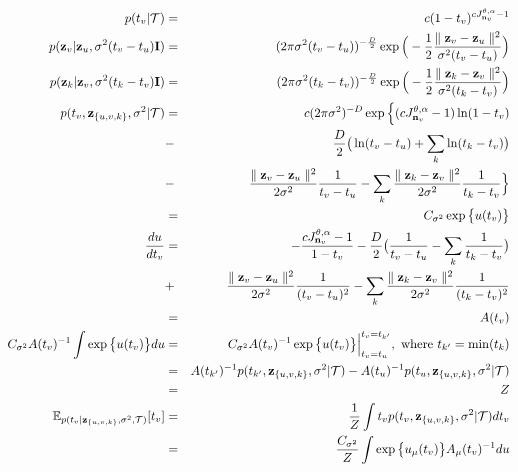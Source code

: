 \documentclass{article}
\begin{document}
	\begin{eqnarray}
	p(t_v | \mathcal{T}) &=& c(1-t_v)^{cJ^{\theta,\alpha}_{\bold{n}_v} - 1} \\
	p(\bold{z}_v | \bold{z}_u, \sigma^2(t_v - t_u)\bold{I}) &=& (2 \pi \sigma^2(t_v - t_u))^{-\frac{D}{2}} \exp \Big(-\frac{1}{2}\frac{\parallel \bold{z}_v - \bold{z}_u \parallel^2}{\sigma^2 (t_v - t_u)} \Big)\\
	p(\bold{z}_k | \bold{z}_v, \sigma^2(t_k - t_v)\bold{I}) &=& (2 \pi \sigma^2(t_k - t_v))^{-\frac{D}{2}} \exp \Big(-\frac{1}{2}\frac{\parallel \bold{z}_k - \bold{z}_v \parallel^2}{\sigma^2 (t_k - t_v)} \Big)\\
	p(t_v, \bold{z}_{\{u,v,k\}}, \sigma^2 | \mathcal{T}) & = & c(2 \pi \sigma^2)^{-D}\exp \Big\{(cJ^{\theta,\alpha}_{\bold{n}_v} - 1)\ln(1 - t_v) \nonumber \\
	 &-& \frac{D}{2} \big( \ln(t_v - t_u) + \sum_k \ln(t_k - t_v) \big) \nonumber \\
	 &-& \frac{\parallel \bold{z}_v - \bold{z}_u\parallel^2}{2\sigma^2}\frac{1}{t_v - t_u} - \sum_k \frac{\parallel \bold{z}_k - \bold{z}_v\parallel^2}{2\sigma^2}\frac{1}{t_k - t_v} \Big\}  \nonumber\\
	 &=& C_{\sigma^2} \exp \big\{ u(t_v) \big\}\\
	\frac{du}{dt_v} &=& -\frac{cJ^{\theta,\alpha}_{\bold{n}_v} - 1}{1 - t_v} - \frac{D}{2}\big( \frac{1}{t_v - t_u} - \sum_k\frac{1}{t_k - t_v}\big) \nonumber \\
	 &+& \frac{\parallel \bold{z}_v - \bold{z}_u\parallel^2}{2\sigma^2}\frac{1}{(t_v - t_u)^2} - \sum_k \frac{\parallel \bold{z}_k - \bold{z}_v\parallel^2}{2\sigma^2}\frac{1}{(t_k - t_v)^2} \nonumber \\
	 &=& A(t_v)\\
	 C_{\sigma^2} A(t_v)^{-1} \int \exp \big\{u(t_v)\big\}du &=& C_{\sigma^2} A(t_v)^{-1} \exp \big\{u(t_v)\big\}\Big\vert^{t_v = t_{k'}}_{t_v = t_u} ,\textrm{ where } t_{k'} = \min(t_k) \nonumber \\
	 &=& A(t_{k'})^{-1}p(t_{k'}, \bold{z}_{\{u,v,k\}}, \sigma^2 | \mathcal{T}) - A(t_{u})^{-1}p(t_{u}, \bold{z}_{\{u,v,k\}}, \sigma^2 | \mathcal{T})\nonumber \\
	 &=& Z \\
	\mathbb{E}_{p(t_v | \bold{z}_{\{u,v,k\}}, \sigma^2, \mathcal{T})}[t_v] &=& \frac{1}{Z} \int t_v p(t_v, \bold{z}_{\{u,v,k\}}, \sigma^2 | \mathcal{T}) dt_v \nonumber \\
	&=& \frac{C_{\sigma^2}}{Z} \int \exp \big\{ u_\mu(t_v)\big\}A_\mu(t_v)^{-1}du
	\end{eqnarray}
	
\end{document}
